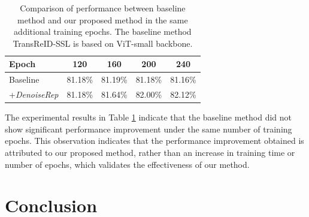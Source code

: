 \documentclass[conference]{IEEEtran}
\begin{document}
{\begin{table}[htbp]
\centering
\caption{Comparison of performance between baseline method and our proposed method in the same additional training epochs. The baseline method TransReID-SSL is based on ViT-small backbone.}
\label{tab:Fairness Experiment}
\vspace{0.2cm}
\renewcommand{\arraystretch}{1.2}
\begin{tabular}{lcccc} %
\hline \hline
\textbf{Epoch} & \textbf{120} & \textbf{160} & \textbf{200} & \textbf{240} \\ 
\midrule
Baseline & 81.18\% & 81.19\% & 81.18\% & 81.16\% \\
+\textit{DenoiseRep} & 81.18\% & 81.64\% & 82.00\% & 82.12\% \\
\hline \hline
\end{tabular}
\end{table}

The experimental results in Table \ref{tab:Fairness Experiment} indicate that the baseline method did not show significant performance improvement under the same number of training epochs. This observation indicates that the performance improvement obtained is attributed to our proposed method, rather than an increase in training time or number of epochs, which validates the effectiveness of our method.

\section{Conclusion}


}
\end{document}
